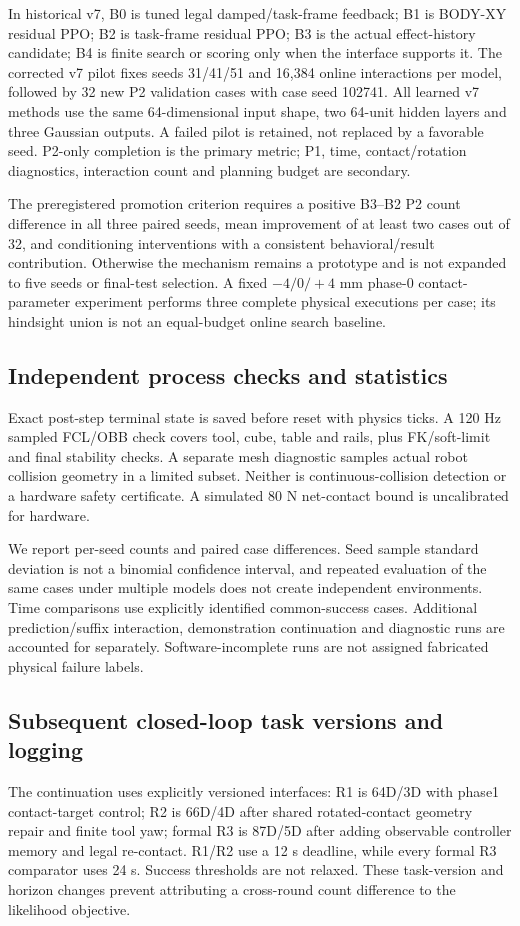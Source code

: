 In historical v7, B0 is tuned legal damped/task-frame feedback; B1 is BODY-XY residual PPO; B2 is task-frame residual PPO; B3 is the actual effect-history candidate; B4 is finite search or scoring only when the interface supports it. The corrected v7 pilot fixes seeds 31/41/51 and 16,384 online interactions per model, followed by 32 new P2 validation cases with case seed 102741. All learned v7 methods use the same 64-dimensional input shape, two 64-unit hidden layers and three Gaussian outputs. A failed pilot is retained, not replaced by a favorable seed. P2-only completion is the primary metric; P1, time, contact/rotation diagnostics, interaction count and planning budget are secondary.

The preregistered promotion criterion requires a positive B3--B2 P2 count difference in all three paired seeds, mean improvement of at least two cases out of 32, and conditioning interventions with a consistent behavioral/result contribution. Otherwise the mechanism remains a prototype and is not expanded to five seeds or final-test selection. A fixed $-4/0/+4$ mm phase-0 contact-parameter experiment performs three complete physical executions per case; its hindsight union is not an equal-budget online search baseline.

\subsection{Independent process checks and statistics}
Exact post-step terminal state is saved before reset with physics ticks. A 120 Hz sampled FCL/OBB check covers tool, cube, table and rails, plus FK/soft-limit and final stability checks. A separate mesh diagnostic samples actual robot collision geometry in a limited subset. Neither is continuous-collision detection or a hardware safety certificate. A simulated 80 N net-contact bound is uncalibrated for hardware.

We report per-seed counts and paired case differences. Seed sample standard deviation is not a binomial confidence interval, and repeated evaluation of the same cases under multiple models does not create independent environments. Time comparisons use explicitly identified common-success cases. Additional prediction/suffix interaction, demonstration continuation and diagnostic runs are accounted for separately. Software-incomplete runs are not assigned fabricated physical failure labels.
\subsection{Subsequent closed-loop task versions and logging}
The continuation uses explicitly versioned interfaces: R1 is 64D/3D with phase1 contact-target control; R2 is 66D/4D after shared rotated-contact geometry repair and finite tool yaw; formal R3 is 87D/5D after adding observable controller memory and legal re-contact. R1/R2 use a 12 s deadline, while every formal R3 comparator uses 24 s. Success thresholds are not relaxed. These task-version and horizon changes prevent attributing a cross-round count difference to the likelihood objective.

